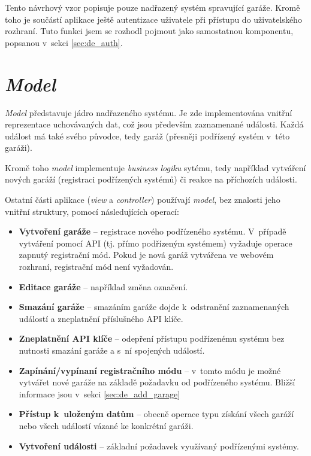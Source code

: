 Tento návrhový vzor popisuje pouze nadřazený systém spravující garáže. Kromě toho je součástí aplikace ještě autentizace uživatele při přístupu do uživatelského rozhraní. Tuto funkci jsem se rozhodl pojmout jako samostatnou komponentu, popsanou v~sekci \ref{sec:de_auth}.

\section{\textit{Model}}

\textit{Model} představuje jádro nadřazeného systému. Je zde implementována vnitřní reprezentace uchovávaných dat, což jsou především zaznamenané události. Každá událost má také svého původce, tedy garáž (přesněji podřízený systém v~této garáži).

Kromě toho \textit{model} implementuje \textit{business logiku} sytému, tedy například vytváření nových garáží (registraci podřízených systémů) či reakce na příchozích události.

Ostatní části aplikace (\textit{view} a \textit{controller}) používají \textit{model}, bez znalosti jeho vnitřní struktury, pomocí následujících operací:

\begin{itemize}
    \item \textbf{Vytvoření garáže} -- registrace nového podřízeného systému. V~případě vytváření pomocí API (tj. přímo podřízeným systémem) vyžaduje operace zapnutý registrační mód. Pokud je nová garáž vytvářena ve webovém rozhraní, registrační mód není vyžadován.
    \item \textbf{Editace garáže} -- například změna označení.
    \item \textbf{Smazání garáže} -- smazáním garáže dojde k~odstranění zaznamenaných událostí a zneplatnění příslušného API klíče.
    \item \textbf{Zneplatnění API klíče} -- odepření přístupu podřízenému systému bez nutnosti smazání garáže a s~ní spojených událostí.
    \item \textbf{Zapínání/vypínaní registračního módu} -- v~tomto módu je možné vytvářet nové garáže na základě požadavku od podřízeného systému. Bližší informace jsou v~sekci \ref{sec:de_add_garage}
    \item \textbf{Přístup k~uloženým datům} -- obecně operace typu získání všech garáží nebo všech událostí vázané ke konkrétní garáži.
    \item \textbf{Vytvoření události} -- základní požadavek využívaný podřízenými systémy.
\end{itemize}

